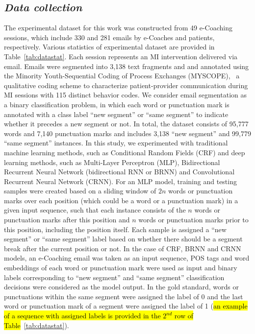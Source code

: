 \documentclass{amia}
\begin{document}
\subsection*{\textit{Data collection}}
The experimental dataset for this work was constructed from 49 e-Coaching sessions, which include 330 and 281 emails by e-Coaches and patients, respectively. Various statistics of experimental dataset are provided in Table~\ref{tab:datastat}. Each session represents an MI intervention delivered via email. Emails were segmented into 3,138 text fragments and and annotated using the Minority Youth-Sequential Coding of Process Exchanges (MYSCOPE),~\cite{carcone2013provider} a qualitative coding scheme to characterize patient-provider communication during MI sessions with 115 distinct behavior codes. We consider email segmentation as a binary classification problem, in which each word or punctuation mark is annotated with a class label ``new segment'' or ``same segment'' to indicate whether it precedes a new segment or not. In total, the dataset consists of 95,777 words and 7,140 punctuation marks and includes 3,138 ``new segment'' and 99,779 ``same segment'' instances. In this study, we experimented with traditional machine learning methods, such as Conditional Random Fields (CRF)\cite{lafferty2001conditional} and deep learning methods, such as Multi-Layer Perceptron (MLP),\cite{rumelhart1986learning} Bidirectional Recurrent Neural Network (bidirectional RNN or BRNN)\cite{schuster1997bidirectional} and Convolutional Recurrent Neural Network (CRNN).\cite{treviso2017sentence} For an MLP model, training and testing samples were created based on a sliding window of $2n$ words or punctuation marks over each position (which could be a word or a punctuation mark) in a given input sequence, such that each instance consists of the $n$ words or punctuation marks after this position and $n$ words or punctuation marks prior to this position, including the position itself. Each sample is assigned a ``new segment'' or ``same segment'' label based on whether there should be a segment break after the current position or not. In the case of CRF, BRNN and CRNN models, an e-Coaching email was taken as an input sequence, POS tags and word embeddings of each word or punctuation mark were used as input and binary labels corresponding to ``new segment'' and ``same segment'' classification decisions were considered as the model output. In the gold standard, words or punctuations within the same segment were assigned the label of 0 and the last word or punctuation mark of a segment were assigned the label of 1 (\hl{an example of a sequence with assigned labels is provided in the $2^{nd}$ row of Table}~\ref{tab:datastat}). \\ 
\end{document}
